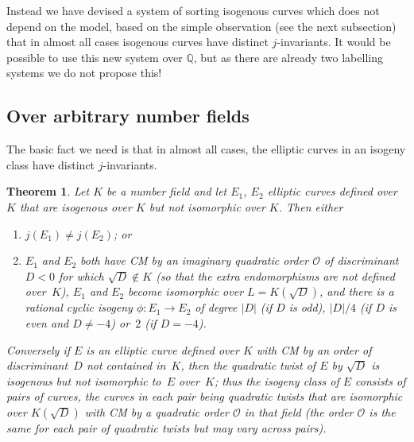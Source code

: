 \documentclass{article}
\newtheorem{thm}{Theorem}[section]
\def\Q{{\mathbb Q}}
\def\OO{{\mathcal O}}
\begin{document}
Instead we have devised a system of sorting isogenous curves which
does not depend on the model, based on the simple observation (see the
next subsection) that in almost all cases isogenous curves have
distinct $j$-invariants.  It would be possible to use this new system
over $\Q$, but as there are already two labelling systems we do not
propose this!

\subsection{Over arbitrary number fields}

The basic fact we need is that in almost all cases, the elliptic
curves in an isogeny class have distinct $j$-invariants.

\begin{thm}
Let $K$ be a number field and let $E_1$, $E_2$ elliptic curves defined
over~$K$ that are isogenous over $K$ but not isomorphic over $K$.
Then either
\begin{enumerate}
\item $j(E_1)\not=j(E_2)$; or
\item $E_1$ and $E_2$ both have CM by an imaginary quadratic order $\OO$
  of discriminant~$D<0$ for which $\sqrt{D}\notin K$ (so that the extra
  endomorphisms are not defined over~$K$), $E_1$ and $E_2$ become
  isomorphic over $L=K(\sqrt{D})$, and there is a rational cyclic isogeny $\phi\colon E_1\to E_2$
   of degree $|D|$ (if $D$ is odd), $|D|/4$
  (if $D$ is even and $D\not=-4$) or~$2$ (if $D=-4$).
\end{enumerate}
Conversely if $E$ is an elliptic curve defined over $K$ with CM by an
order of discriminant~$D$ not contained in~$K$, then the quadratic
twist of $E$ by $\sqrt{D}$ is isogenous but not isomorphic to~$E$
over~$K$; thus the isogeny class of $E$ consists of pairs of
curves, the curves in each pair being quadratic twists that are isomorphic
over $K(\sqrt{D})$ with CM by a quadratic order $\OO$ in that field (the
order $\OO$ is the same for each pair of quadratic twists but may vary across pairs).

\end{thm}
\end{document}
